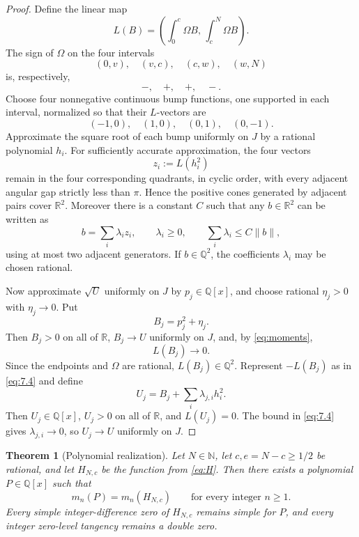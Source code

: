 \documentclass[11pt]{article}
\newtheorem{theorem}{Theorem}[section]
\theoremstyle{definition}
\theoremstyle{remark}
\newcommand{\R}{\mathbb{R}}
\newcommand{\N}{\mathbb{N}}
\begin{document}
\begin{proof}
Define the linear map
\[
L(B)=
\left(
\int_0^c\Omega B,\,
\int_c^N\Omega B
\right).
\]
The sign of \(\Omega\) on the four intervals
\[
(0,v),\quad(v,c),\quad(c,w),\quad(w,N)
\]
is, respectively,
\[
-,\quad+,\quad+,\quad-.
\]
Choose four nonnegative continuous bump functions, one supported in each
interval, normalized so that their \(L\)-vectors are
\[
(-1,0),\quad(1,0),\quad(0,1),\quad(0,-1).
\]
Approximate the square root of each bump uniformly on \(J\) by a rational
polynomial \(h_i\).  For sufficiently accurate approximation, the four
vectors
\[
z_i:=L(h_i^2)
\]
remain in the four corresponding quadrants, in cyclic order, with every
adjacent angular gap strictly less than \(\pi\).  Hence the positive cones
generated by adjacent pairs cover \(\R^2\).  Moreover there is a constant
\(C\) such that any \(b\in\R^2\) can be written as
\[
b=\sum_i\lambda_i z_i,\qquad
\lambda_i\ge0,\qquad
\sum_i\lambda_i\le C\|b\|,
\tag{7.4}\label{eq:7.4}
\]
using at most two adjacent generators.  If \(b\in\mathbb Q^2\), the
coefficients \(\lambda_i\) may be chosen rational.

Now approximate \(\sqrt U\) uniformly on \(J\) by
\(p_j\in\mathbb Q[x]\), and choose rational \(\eta_j>0\) with
\(\eta_j\to0\).  Put
\[
B_j=p_j^2+\eta_j.
\]
Then \(B_j>0\) on all of \(\R\), \(B_j\to U\) uniformly on \(J\), and,
by \eqref{eq:moments},
\[
L(B_j)\to0.
\]
Since the endpoints and \(\Omega\) are rational, \(L(B_j)\in\mathbb Q^2\).
Represent \(-L(B_j)\) as in \eqref{eq:7.4} and define
\[
U_j=B_j+\sum_i\lambda_{j,i}h_i^2.
\]
Then \(U_j\in\mathbb Q[x]\), \(U_j>0\) on all of \(\R\), and
\(L(U_j)=0\).  The bound in \eqref{eq:7.4} gives
\(\lambda_{j,i}\to0\), so \(U_j\to U\) uniformly on \(J\).
\end{proof}

\begin{theorem}[Polynomial realization]\label{thm:poly}
Let \(N\in\N\), let \(c,e=N-c\ge1/2\) be rational, and let
\(H_{N,c}\) be the function from \eqref{eq:H}.  Then there exists a
polynomial \(P\in\mathbb Q[x]\) such that
\[
m_n(P)=m_n(H_{N,c})
\qquad\text{for every integer }n\ge1.
\]
Every simple integer-difference zero of \(H_{N,c}\) remains simple for
\(P\), and every integer zero-level tangency remains a double zero.
\end{theorem}
\end{document}
